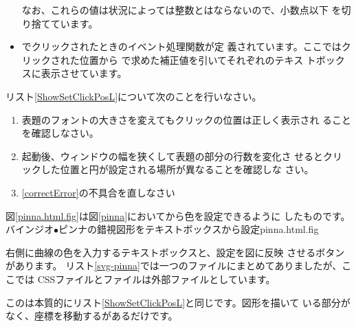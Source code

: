 \begin{itemize}
			 なお、これらの値は状況によっては整数とはならないので、小数点以下
			 を切り捨てています。
 \item {}でクリックされたときのイベント処理関数が定
       義されています。ここではクリックされた位置から
       で求めた補正値を引いてそれぞれのテキス
       トボックスに表示させています。
\end{itemize}
\begin{Problem}\upshape
 リスト\ref{ShowSetClickPosL}について次のことを行いなさい。
\begin{enumerate}
 \item 表題のフォントの大きさを変えてもクリックの位置は正しく表示され
       ることを確認しなさい。
 \item 起動後、ウィンドウの幅を狭くして表題の部分の行数を変化さ
       せるとクリックした位置と円が設定される場所が異なることを確認しな
       さい。\label{correctError}
 \item \ref{correctError}の不具合を直しなさい
\end{enumerate}
\end{Problem}
図\ref{pinna.html.fig}は図\ref{pinna}において\HTML から色を設定できるように
したものです。
{バインジオ$\bullet$ピンナの錯視図形をテキストボックスから設定}{pinna.html.fig}

右側に曲線の色を入力するテキストボックスと、設定を図に反映
させるボタンがあります。
リスト\ref{svg-pinna}では一つのファイルにまとめてありましたが、ここでは
CSSファイルと\JS ファイルは外部ファイルとしています。

この\HTML は本質的にリスト\ref{ShowSetClickPosL}と同じです。図形を描いて
いる部分がなく、座標を移動するがあるだけです。

